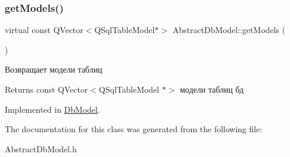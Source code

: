 \subsubsection{\texorpdfstring{get\+Models()}{getModels()}}
{\footnotesize\ttfamily virtual const Q\+Vector$<$Q\+Sql\+Table\+Model$\ast$$>$ Abstract\+Db\+Model\+::get\+Models (\begin{DoxyParamCaption}{ }\end{DoxyParamCaption})\hspace{0.3cm}{\ttfamily [pure virtual]}}



Возвращает модели таблиц 

\begin{DoxyReturn}{Returns}
const Q\+Vector$<$\+Q\+Sql\+Table\+Model $\ast$$>$ модели таблиц бд 
\end{DoxyReturn}


Implemented in \hyperlink{class_db_model_aa185ea5bffa09016b3efb99591d173d3}{Db\+Model}.



The documentation for this class was generated from the following file\+:\begin{DoxyCompactItemize}
\item 
Abstract\+Db\+Model.\+h\end{DoxyCompactItemize}
